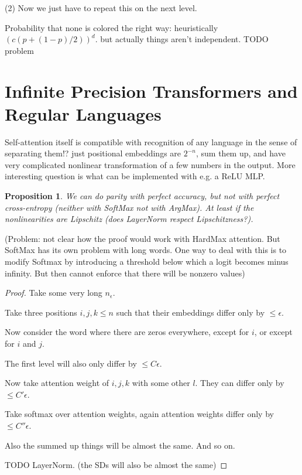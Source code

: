 \documentclass[11pt,a4paper]{article}
\newcounter{theorem}
\newtheorem{proposition}[theorem]{Proposition}
\begin{document}
(2) Now we just have to repeat this on the next level.

Probability that none is colored the right way: heuristically $(c(p+(1-p)/2))^d$. but actually things aren't independent. TODO problem


\section{Infinite Precision Transformers and Regular Languages}

Self-attention itself is compatible with recognition of any language in the sense of separating them!? just positional embeddings are $2^{-n}$, sum them up, and have very complicated nonlinear transformation of a few numbers in the output.
More interesting question is what can be implemented with e.g. a ReLU MLP.

\begin{proposition}
We can do parity with perfect accuracy, but not with perfect cross-entropy (neither with SoftMax not with ArgMax). At least if the nonlinearities are Lipschitz (does LayerNorm respect Lipschitzness?).
\end{proposition}


(Problem: not clear how the proof would work with HardMax attention. But SoftMax has its own problem with long words. One way to deal with this is to modify Softmax by introducing a threshold below which a logit becomes minus infinity. But then cannot enforce that there will be nonzero values)

\begin{proof}

Take some very long $n_\epsilon$.

Take three positions $i, j, k \leq n$ such that their embeddings differ only by $\leq \epsilon$.

Now consider the word where there are zeros everywhere, except for $i$, or except for $i$ and $j$.

The first level will also only differ by $\leq C \epsilon$.

Now take attention weight of $i,j,k$ with some other $l$. They can differ only by $\leq C' \epsilon$.

Take softmax over attention weights, again attention weights differ only by $\leq C'' \epsilon$.

Also the summed up things will be almost the same. And so on.

TODO LayerNorm. (the SDs will also be almost the same)
\end{proof}
\end{document}
